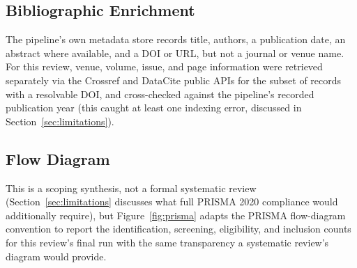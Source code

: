 \documentclass[11pt]{article}
\begin{document}
\subsection{Bibliographic Enrichment}

The pipeline's own metadata store records title, authors, a publication date, an abstract where available, and a DOI or URL, but not a journal or venue name. For this review, venue, volume, issue, and page information were retrieved separately via the Crossref and DataCite public APIs for the subset of records with a resolvable DOI, and cross-checked against the pipeline's recorded publication year (this caught at least one indexing error, discussed in Section~\ref{sec:limitations}).

\subsection{Flow Diagram}
\label{sec:prisma}

This is a scoping synthesis, not a formal systematic review (Section~\ref{sec:limitations} discusses what full PRISMA 2020 compliance would additionally require), but Figure~\ref{fig:prisma} adapts the PRISMA flow-diagram convention to report the identification, screening, eligibility, and inclusion counts for this review's final run with the same transparency a systematic review's diagram would provide.
\end{document}
